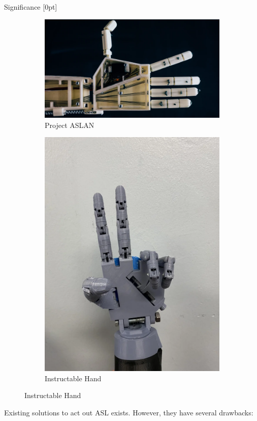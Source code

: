 \documentclass[final, 20pt]{beamer}
\newlength{\colwidth}
\begin{document}
\begin{frame}[t]
\begin{columns}[t]
    \begin{column}{\colwidth}
      \begin{block}{Significance}
        [0pt]
        \vspace{1cm}
        \begin{figure}[ht]
          \centering
          \begin{subfigure}[b]{0.45\linewidth}
            \centering
            \includegraphics[width=\linewidth]{images/aslan.png}
            \caption{Project ASLAN}
            \label{fig:aslan}
          \end{subfigure}
          \begin{subfigure}[b]{0.45\linewidth}
            \centering
            \includegraphics[width=0.425\linewidth]{images/instructable-hand.png}
            \caption{Instructable Hand}
            \label{fig:instructable-hand}
          \end{subfigure}
        \end{figure}

        Existing solutions to act out ASL exists. However, they have several drawbacks:


\end{block}
\end{column}
\end{columns}
\end{frame}
\end{document}
